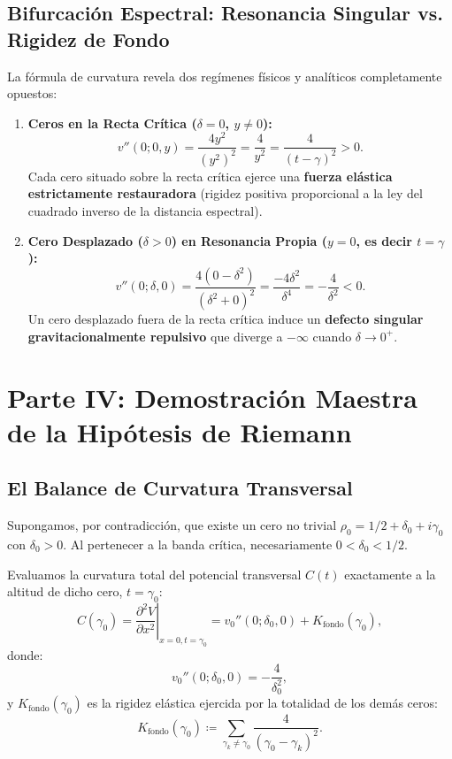 \documentclass[11pt,a4paper]{article}
\theoremstyle{definition}
\theoremstyle{remark}
\begin{document}
\subsection{Bifurcación Espectral: Resonancia Singular vs. Rigidez de Fondo}

La fórmula de curvatura revela dos regímenes físicos y analíticos completamente opuestos:

\begin{enumerate}
    \item \textbf{Ceros en la Recta Crítica ($\delta = 0$, $y \neq 0$):}
    \begin{equation}
    v''(0; 0, y) = \frac{4y^2}{(y^2)^2} = \frac{4}{y^2} = \frac{4}{(t - \gamma)^2} > 0.
    \end{equation}
    Cada cero situado sobre la recta crítica ejerce una \textbf{fuerza elástica estrictamente restauradora} (rigidez positiva proporcional a la ley del cuadrado inverso de la distancia espectral).
    
    \item \textbf{Cero Desplazado ($\delta > 0$) en Resonancia Propia ($y = 0$, es decir $t = \gamma$):}
    \begin{equation}
    v''(0; \delta, 0) = \frac{4(0 - \delta^2)}{(\delta^2 + 0)^2} = \frac{-4\delta^2}{\delta^4} = -\frac{4}{\delta^2} < 0.
    \end{equation}
    Un cero desplazado fuera de la recta crítica induce un \textbf{defecto singular gravitacionalmente repulsivo} que diverge a $-\infty$ cuando $\delta \to 0^+$.
\end{enumerate}

\section{Parte IV: Demostración Maestra de la Hipótesis de Riemann}

\subsection{El Balance de Curvatura Transversal}

Supongamos, por contradicción, que existe un cero no trivial $\rho_0 = 1/2 + \delta_0 + i\gamma_0$ con $\delta_0 > 0$. Al pertenecer a la banda crítica, necesariamente $0 < \delta_0 < 1/2$.

Evaluamos la curvatura total del potencial transversal $C(t)$ exactamente a la altitud de dicho cero, $t = \gamma_0$:
\begin{equation}
C(\gamma_0) = \left. \frac{\partial^2 V}{\partial x^2} \right|_{x=0, t=\gamma_0} = v_0''(0; \delta_0, 0) + K_{\text{fondo}}(\gamma_0),
\end{equation}
donde:
\begin{equation}
v_0''(0; \delta_0, 0) = -\frac{4}{\delta_0^2},
\end{equation}
y $K_{\text{fondo}}(\gamma_0)$ es la rigidez elástica ejercida por la totalidad de los demás ceros:
\begin{equation}
K_{\text{fondo}}(\gamma_0) \coloneqq \sum_{\gamma_k \neq \gamma_0} \frac{4}{(\gamma_0 - \gamma_k)^2}.
\end{equation}
\end{document}
